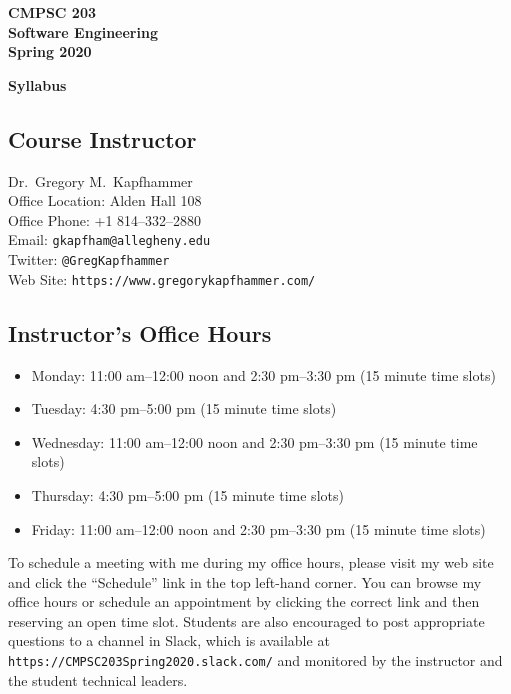 \documentclass[11pt]{article}
\newcommand{\url}[1]{\lstinline{#1}}
\newcommand{\syllabustitle}[1]
{
  \begin{center}
    \begin{center}
      \bf
      CMPSC 203\\Software Engineering\\
      Spring 2020\\
      \medskip
    \end{center}
    \bf
    #1
  \end{center}
}
\begin{document}
\thispagestyle{empty}

\syllabustitle{Syllabus}

\vspace*{-1em}
\subsection*{Course Instructor}
Dr.\ Gregory M.\ Kapfhammer\\
\noindent Office Location: Alden Hall 108 \\
\noindent Office Phone: +1 814--332--2880 \\
\noindent Email: \url{gkapfham@allegheny.edu} \\
\noindent Twitter: \url{@GregKapfhammer} \\
\noindent Web Site: \url{https://www.gregorykapfhammer.com/}

\subsection*{Instructor's Office Hours}

\begin{itemize}

  \itemsep.05em

  \item Monday: 11:00 am--12:00 noon and 2:30 pm--3:30 pm (15 minute time slots)

  \item Tuesday: 4:30 pm--5:00 pm (15 minute time slots)

  \item Wednesday: 11:00 am--12:00 noon and 2:30 pm--3:30 pm (15 minute time slots)

  \item Thursday: 4:30 pm--5:00 pm (15 minute time slots)

  \item Friday: 11:00 am--12:00 noon and 2:30 pm--3:30 pm (15 minute time slots)

\end{itemize}

\noindent To schedule a meeting with me during my office hours, please visit my
web site and click the ``Schedule'' link in the top left-hand corner. You can
browse my office hours or schedule an appointment by clicking the correct link
and then reserving an open time slot. Students are also encouraged to post
appropriate questions to a channel in Slack, which is available at
\url{https://CMPSC203Spring2020.slack.com/} and monitored by the instructor and
the student technical leaders.
\end{document}
